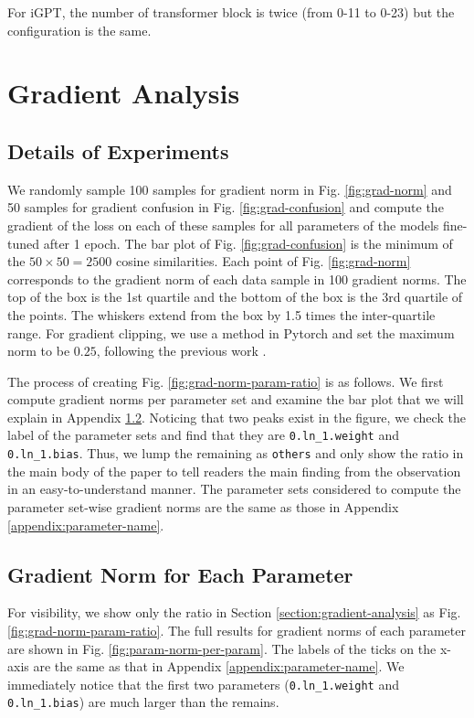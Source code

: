\documentclass{article}
\begin{document}
For iGPT, the number of transformer block is twice (from 0-11 to 0-23) but the configuration is the same.

\section{Gradient Analysis}
\label{appendix:gradient-analysis}

\subsection{Details of Experiments}
\label{appendix:detail-of-experiments-gradient-analysis}
We randomly sample 100 samples for gradient norm in Fig. \ref{fig:grad-norm} and 50 samples for gradient confusion in Fig. \ref{fig:grad-confusion} and compute the gradient of the loss on each of these samples for all parameters of the models fine-tuned after 1 epoch. The bar plot of Fig. \ref{fig:grad-confusion} is the minimum of the $50 \times 50 = 2500$ cosine similarities. Each point of Fig. \ref{fig:grad-norm} corresponds to the gradient norm of each data sample in 100 gradient norms. The top of the box is the 1st quartile and the bottom of the box is the 3rd quartile of the points. The whiskers extend from the box by 1.5 times the inter-quartile range. For gradient clipping, we use a method in Pytorch \cite{Paszke19} and set the maximum norm to be $0.25$, following the previous work \cite{reid2022can}. 

The process of creating Fig. \ref{fig:grad-norm-param-ratio} is as follows. We first compute gradient norms per parameter set and examine the bar plot that we will explain in Appendix \ref{appendix:gradient-norm-for-each-parameter}. Noticing that two peaks exist in the figure, we check the label of the parameter sets and find that they are \lstinline{0.ln_1.weight} and \lstinline{0.ln_1.bias}. Thus, we lump the remaining as \lstinline{others} and only show the ratio in the main body of the paper to tell readers the main finding from the observation in an easy-to-understand manner. The parameter sets considered to compute the parameter set-wise gradient norms are the same as those in Appendix \ref{appendix:parameter-name}.

\subsection{Gradient Norm for Each Parameter}
\label{appendix:gradient-norm-for-each-parameter}
For visibility, we show only the ratio in Section \ref{section:gradient-analysis} as Fig. \ref{fig:grad-norm-param-ratio}. The full results for gradient norms of each parameter are shown in Fig. \ref{fig:param-norm-per-param}. The labels of the ticks on the x-axis are the same as that in Appendix \ref{appendix:parameter-name}. We immediately notice that the first two parameters (\lstinline{0.ln_1.weight} and \lstinline{0.ln_1.bias}) are much larger than the remains.
\end{document}
